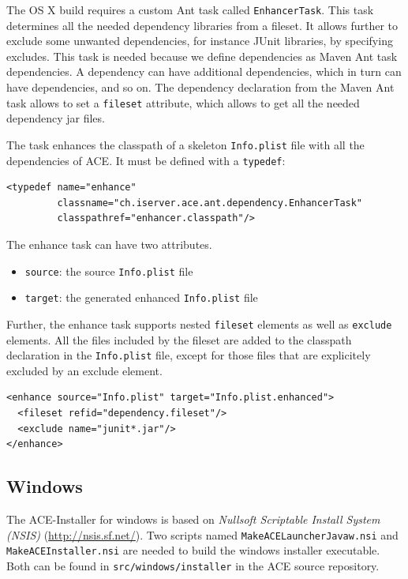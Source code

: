 \documentclass[11pt,a4paper]{article}
\begin{document}
The OS X build requires a custom Ant task called \texttt{EnhancerTask}. 
This task determines all the needed
dependency libraries from a fileset. It allows further to exclude some
unwanted dependencies, for instance JUnit libraries, by specifying excludes.
This task is needed because we define dependencies as Maven Ant task
dependencies. A dependency can have additional dependencies, which in turn
can have dependencies, and so on. The dependency declaration from 
the Maven Ant task allows to set a \texttt{fileset} attribute, which allows to
get all the needed dependency jar files.

The task enhances the classpath of a skeleton \texttt{Info.plist} file with all
the dependencies of ACE. It must be defined with a \texttt{typedef}:
\small{
\begin{verbatim}
<typedef name="enhance"
         classname="ch.iserver.ace.ant.dependency.EnhancerTask"
         classpathref="enhancer.classpath"/>
\end{verbatim}
}

The enhance task can have two attributes.
\begin{itemize}
 \item \texttt{source}: the source \texttt{Info.plist} file
 \item \texttt{target}: the generated enhanced \texttt{Info.plist} file
\end{itemize}

Further, the enhance task supports nested \texttt{fileset} elements as well
as \texttt{exclude} elements. All the files included by the fileset are
added to the classpath declaration in the \texttt{Info.plist} file, except
for those files that are explicitely excluded by an exclude element.

\small{
\begin{verbatim}
<enhance source="Info.plist" target="Info.plist.enhanced">
  <fileset refid="dependency.fileset"/>
  <exclude name="junit*.jar"/>
</enhance>
\end{verbatim}
}


\subsection{Windows}
The ACE-Installer for windows is based on \textit{Nullsoft Scriptable Install System (NSIS)} (\href{http://nsis.sf.net/}{http://nsis.sf.net/}). Two scripts named \texttt{MakeACELauncherJavaw.nsi} and \texttt{MakeACEInstaller.nsi} are needed to build the windows installer executable. Both can be found in \texttt{src/windows/installer} in the ACE source repository.
\end{document}
